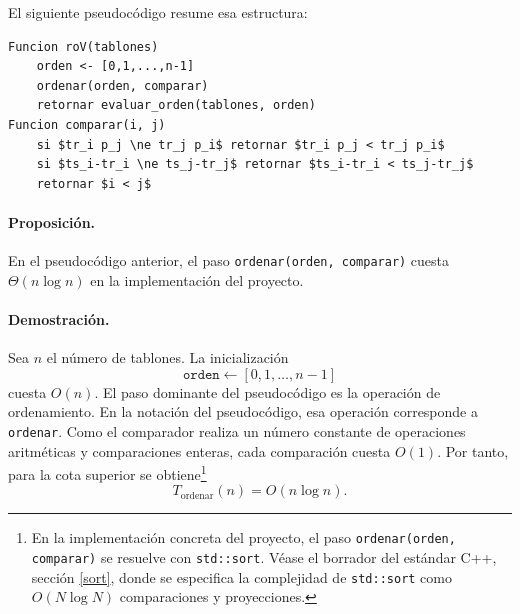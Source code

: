 \documentclass[12pt,a4paper]{article}
\begin{document}
El siguiente pseudoc\'odigo resume esa estructura:

\begin{center}
\begin{minipage}{0.88\textwidth}
\begin{lstlisting}[style=pseudobloque,basicstyle=\ttfamily\normalsize\linespread{1.12}\selectfont]
Funcion roV(tablones)
    orden <- [0,1,...,n-1]
    ordenar(orden, comparar)
    retornar evaluar_orden(tablones, orden)
Funcion comparar(i, j)
    si $tr_i p_j \ne tr_j p_i$ retornar $tr_i p_j < tr_j p_i$
    si $ts_i-tr_i \ne ts_j-tr_j$ retornar $ts_i-tr_i < ts_j-tr_j$
    retornar $i < j$
\end{lstlisting}
\end{minipage}
\end{center}

\paragraph{Proposici\'on.}
En el pseudoc\'odigo anterior, el paso \texttt{ordenar(orden, comparar)} cuesta \(\Theta(n\log n)\) en la implementaci\'on del proyecto.

\paragraph{Demostraci\'on.}
Sea \(n\) el n\'umero de tablones. La inicializaci\'on
\[
\texttt{orden} \leftarrow [0,1,\dots,n-1]
\]
cuesta \(O(n)\). El paso dominante del pseudoc\'odigo es la operaci\'on de ordenamiento. En la notaci\'on del pseudoc\'odigo, esa operaci\'on corresponde a \texttt{ordenar}. Como el comparador realiza un n\'umero constante de operaciones aritm\'eticas y comparaciones enteras, cada comparaci\'on cuesta \(O(1)\). Por tanto, para la cota superior se obtiene\footnote{En la implementaci\'on concreta del proyecto, el paso \texttt{ordenar(orden, comparar)} se resuelve con \texttt{std::sort}. V\'ease el borrador del est\'andar C++, secci\'on \href{https://eel.is/c++draft/sort}{[sort]}, donde se especifica la complejidad de \texttt{std::sort} como \(O(N\log N)\) comparaciones y proyecciones.}
\[
T_{\text{ordenar}}(n)=O(n\log n).
\]
\end{document}
